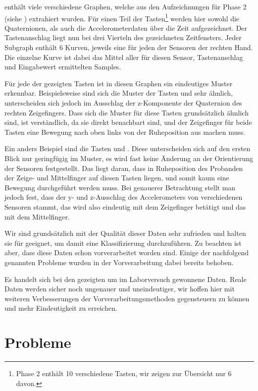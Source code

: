  enthält viele verschiedene Graphen, welche aus den
Aufzeichnungen für Phase 2 (siehe ) extrahiert wurden. Für einen
Teil der Tasten\footnote{Phase 2 enthält 10 verschiedene Tasten, wir zeigen zur
Übersicht nur 6 davon.} werden hier sowohl die Quaternionen, als auch die
Accelerometerdaten über die Zeit aufgezeichnet. Der Tastenanschlag liegt nun
bei drei Vierteln des gezeichneten Zeitfensters. Jeder Subgraph enthält 6
Kurven, jeweils eine für jeden der Sensoren der rechten Hand. Die einzelne
Kurve ist dabei das Mittel aller für diesen Sensor, Tastenanschlag und
Eingabewert ermittelten Samples.

Für jede der gezeigten Tasten ist in diesen Graphen ein eindeutiges Muster
erkennbar. Beispielsweise sind sich die Muster der Tasten  und
 sehr ähnlich, unterscheiden sich jedoch im Ausschlag der
z-Komponente der Quaternion des rechten Zeigefingers. Dass sich die Muster für
diese Tasten grundsätzlich ähnlich sind, ist verständlich, da sie direkt
benachbart sind, und der Zeigefinger für beide Tasten eine Bewegung nach oben
links von der Ruheposition aus machen muss.

Ein anders Beispiel sind die Tasten  und . Diese
unterscheiden sich auf den ersten Blick nur geringfügig im Muster, es wird fast
keine Änderung an der Orientierung der Sensoren festgestellt. Das liegt daran,
dass in Ruheposition des Probanden der Zeige- und Mittelfinger auf diesen
Tasten liegen, und somit kaum eine Bewegung durchgeführt werden muss. Bei
genauerer Betrachtung stellt man jedoch fest, dass der y- und z-Ausschlag des
Accelerometers von verschiedenen Sensoren stammt, das  wird also
eindeutig mit dem Zeigefinger betätigt und das  mit dem
Mittelfinger.

Wir sind grundsätzlich mit der Qualität dieser Daten sehr zufrieden und halten
sie für geeignet, um damit eine Klassifizierung durchzuführen. Zu beachten ist
aber, dass diese Daten schon vorverarbeitet worden sind. Einige der
nachfolgend genannten Probleme wurden in der Vorverarbeitung dabei bereits
behoben.

Es handelt sich bei den gezeigten um im Laborversuch gewonnene Daten. Reale
Daten werden sicher noch ungenauer und uneindeutiger, wir hoffen hier mit
weiteren Verbesserungen der Vorverarbeitungsmethoden gegensteuern zu können und
mehr Eindeutigkeit zu erreichen.

\section{Probleme} 

